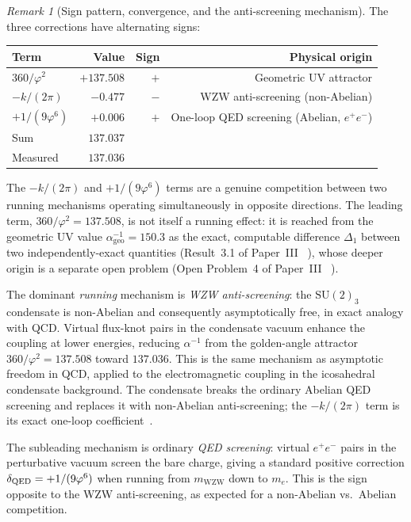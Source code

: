 \documentclass[11pt,a4paper]{article}
\theoremstyle{definition}
\theoremstyle{remark}
\newtheorem{remark}[theorem]{Remark}
\newcommand{\vp}{\varphi}
\newcommand{\aInv}{\alpha^{-1}}
\newcommand{\mWZW}{m_{\mathrm{WZW}}}
\begin{document}
\begin{remark}[Sign pattern, convergence, and the anti-screening mechanism]
\label{P4:rem:sign_pattern}
The three corrections have alternating signs:
\begin{center}
\begin{tabular}{lrrr}
\toprule
Term & Value & Sign & Physical origin \\
\midrule
$360/\vp^2$ & $+137.508$ & $+$ & Geometric UV attractor \\
$-k/(2\pi)$ & $-0.477$ & $-$ & WZW anti-screening (non-Abelian) \\
$+1/(9\vp^6)$ & $+0.006$ & $+$ & One-loop QED screening (Abelian, $e^+e^-$) \\
\midrule
Sum & $137.037$ & & \\
Measured & $137.036$ & & \\
\bottomrule
\end{tabular}
\end{center}
The $-k/(2\pi)$ and $+1/(9\vp^6)$ terms are a genuine competition between
two running mechanisms operating simultaneously in opposite directions.
The leading term, $360/\vp^2=137.508$, is not itself a running effect:
it is reached from the geometric UV value $\aInv_{\mathrm{geo}}=150.3$
as the exact, computable difference $\Delta_1$ between two
independently-exact quantities (Result~3.1 of Paper~III~\cite{Paper3}%
), whose deeper origin is a separate open
problem (Open Problem~4 of Paper~III~\cite{Paper3}%
).

The dominant \emph{running} mechanism is \emph{WZW anti-screening}: the
$\mathrm{SU}(2)_3$ condensate is non-Abelian and consequently
asymptotically free, in exact analogy with QCD.  Virtual flux-knot
pairs in the condensate vacuum enhance the coupling at lower energies,
reducing $\aInv$ from the golden-angle attractor $360/\vp^2=137.508$
toward $137.036$.  This is the same mechanism as asymptotic freedom in
QCD, applied to the electromagnetic coupling in the icosahedral
condensate background.  The condensate breaks the ordinary Abelian QED
screening and replaces it with non-Abelian anti-screening; the
$-k/(2\pi)$ term is its exact one-loop coefficient~\cite{KZ1984}.

The subleading mechanism is ordinary \emph{QED screening}: virtual $e^+e^-$
pairs in the perturbative vacuum screen the bare charge, giving a standard
positive correction $\delta_{\rm QED} = +1/(9\vp^6)$ when running from $\mWZW$
down to $m_e$.  This is the sign opposite to the WZW anti-screening,
as expected for a non-Abelian vs.\ Abelian competition.


\end{remark}
\end{document}
